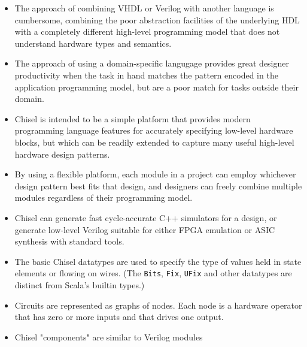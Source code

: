 \documentclass{beamer}
\begin{document}
\begin{frame}
\begin{itemize}

\item The approach of combining VHDL or Verilog with another language is cumbersome, combining the poor abstraction facilities of the underlying HDL with a completely different high-level programming model that does not understand hardware types and semantics.

\item The approach of using a domain-specific langugage provides great designer productivity when the task in hand matches the pattern encoded in the application programming model, but are a poor match for tasks outside their domain.

\end{itemize}
\end{frame}

\begin{frame}
\begin{itemize}

\item Chisel is intended to be a simple platform that provides modern programming language features for accurately specifying low-level hardware blocks, but which can be readily extended to capture many useful high-level hardware design patterns.

\item By using a flexible platform, each module in a project can employ whichever design pattern best fits that design, and designers can freely combine multiple modules regardless of their programming model.

\item Chisel can generate fast cycle-accurate C++ simulators for a design, or generate low-level Verilog suitable for either FPGA emulation or ASIC synthesis with standard tools.

\end{itemize}
\end{frame}

\begin{frame}
\begin{itemize}

\item The basic Chisel datatypes are used to specify the type of values held in state elements or flowing on wires. (The \texttt{Bits}, \texttt{Fix}, \texttt{UFix} and other datatypes are distinct from Scala's builtin types.)

\item Circuits are represented as graphs of nodes. Each node is a hardware operator that has zero or more inputs and that drives one output.

\item Chisel "components" are similar to Verilog modules

\end{itemize}
\end{frame}
\end{document}
